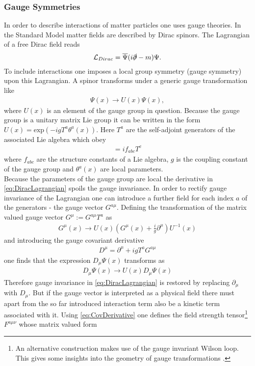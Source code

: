 \subsubsection*{Gauge Symmetries} 
In order to describe interactions of matter particles one uses gauge theories. In the Standard Model matter fields are described by Dirac spinors. The Lagrangian of a free Dirac field reads
\begin{align}
\mathcal{L}_{Dirac} = \overline{\Psi} ( i\slashed{\partial} - m)\Psi.\label{eq:DiracLagrangian}
\end{align}
To include interactions one imposes a local group symmetry (gauge symmetry) upon this Lagrangian. A spinor transforms under a generic gauge transformation like 
\begin{align}
\Psi(x) \to U(x)\Psi(x),
\end{align}
where $U(x)$ is an element of the gauge group in question. Because the gauge group is a unitary matrix Lie group it can be written in the form $U(x)=\mathrm{exp}(-igT^a\theta^a(x))$. Here $T^a$ are the self-adjoint generators of the associated Lie algebra which obey
\begin{align}
[T^a,T^b] = if_{abc}T^c
\end{align}
where $f_{abc}$ are the structure constants of a Lie algebra, $g$ is the coupling constant of the gauge group and $\theta^a(x)$ are local parameters.\\
Because the parameters of the gauge group are local the derivative in \ref{eq:DiracLagrangian} spoils the gauge invariance. In order to rectify gauge invariance of the Lagrangian one can introduce a further field for each index $a$ of the generators - the gauge vector $G^{a\mu}$. Defining the transformation of the matrix valued gauge vector $G^\mu := G^{a\mu}T^a$ as 
\begin{align}
G^{\mu}(x) \to U(x) \left( G^\mu(x) + \frac{i}{g}\partial^\mu \right) U^{-1}(x)
\end{align}
and introducing the gauge covariant derivative
\begin{align}
D^\mu = \partial^\mu + igT^aG^{a\mu}
\end{align}
one finds that the expression $D_\mu \Psi(x)$ transforms as
\begin{align}
D_\mu \Psi(x) \to U(x) D_\mu \Psi(x) \label{eq:CovDerivative}
\end{align}
Therefore gauge invariance in \ref{eq:DiracLagrangian} is restored by replacing $\partial_\mu$ with $D_\mu$. But if the gauge vector is interpreted as a physical field there must apart from the so far introduced interaction term also be a kinetic term associated with it. Using \ref{eq:CovDerivative} one defines the field strength tensor\footnote{An alternative construction makes use of the gauge invariant Wilson loop. This gives some insights into the geometry of gauge transformations \cite{Peskin}.} $F^{a\mu\nu}$ whose matrix valued form
